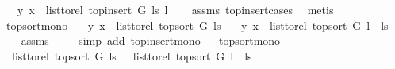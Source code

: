 \begin{isabellebody}
\ \ \ {\isachardoublequoteopen}{\isacharparenleft}{\kern0pt}y{\isacharcomma}{\kern0pt}\ x{\isacharparenright}{\kern0pt}\ {\isasymnotin}\ list{\isacharunderscore}{\kern0pt}to{\isacharunderscore}{\kern0pt}rel\ {\isacharparenleft}{\kern0pt}top{\isacharunderscore}{\kern0pt}insert\ G\ ls\ l{\isacharparenright}{\kern0pt}{\isachardoublequoteclose}\isanewline
%
\isadelimproof
\ \ %
\endisadelimproof
%
\isatagproof
{}\isamarkupfalse%
\ assms\ top{\isacharunderscore}{\kern0pt}insert{\isacharunderscore}{\kern0pt}cases\ \isamarkupfalse%
\ metis%
\endisatagproof
{\isafoldproof}%
%
\isadelimproof
\isanewline
%
\endisadelimproof
\isanewline
{}\isamarkupfalse%
\ top{\isacharunderscore}{\kern0pt}sort{\isacharunderscore}{\kern0pt}mono{\isacharcolon}{\kern0pt}\isanewline
\ \ \ {\isachardoublequoteopen}{\isacharparenleft}{\kern0pt}y{\isacharcomma}{\kern0pt}\ x{\isacharparenright}{\kern0pt}\ {\isasymin}\ list{\isacharunderscore}{\kern0pt}to{\isacharunderscore}{\kern0pt}rel\ {\isacharparenleft}{\kern0pt}top{\isacharunderscore}{\kern0pt}sort\ G\ ls{\isacharparenright}{\kern0pt}{\isachardoublequoteclose}\isanewline
\ \ \ {\isachardoublequoteopen}{\isacharparenleft}{\kern0pt}y{\isacharcomma}{\kern0pt}\ x{\isacharparenright}{\kern0pt}\ {\isasymin}\ list{\isacharunderscore}{\kern0pt}to{\isacharunderscore}{\kern0pt}rel\ {\isacharparenleft}{\kern0pt}top{\isacharunderscore}{\kern0pt}sort\ G\ {\isacharparenleft}{\kern0pt}l\ {\isacharhash}{\kern0pt}\ ls{\isacharparenright}{\kern0pt}{\isacharparenright}{\kern0pt}{\isachardoublequoteclose}\isanewline
%
\isadelimproof
\ \ %
\endisadelimproof
%
\isatagproof
{}\isamarkupfalse%
\ assms\ \isanewline
\ \ \isamarkupfalse%
\ {\isacharparenleft}{\kern0pt}simp\ add{\isacharcolon}{\kern0pt}\ top{\isacharunderscore}{\kern0pt}insert{\isacharunderscore}{\kern0pt}mono{\isacharparenright}{\kern0pt}%
\endisatagproof
{\isafoldproof}%
%
\isadelimproof
\ \isanewline
%
\endisadelimproof
\isanewline
\isanewline
\isanewline
{}\isamarkupfalse%
\ top{\isacharunderscore}{\kern0pt}sort{\isacharunderscore}{\kern0pt}mono{}{\isacharcolon}{\kern0pt}\isanewline
\ \ {\isachardoublequoteopen}list{\isacharunderscore}{\kern0pt}to{\isacharunderscore}{\kern0pt}rel\ {\isacharparenleft}{\kern0pt}top{\isacharunderscore}{\kern0pt}sort\ G\ ls{\isacharparenright}{\kern0pt}\ {\isasymsubseteq}\ \ list{\isacharunderscore}{\kern0pt}to{\isacharunderscore}{\kern0pt}rel\ {\isacharparenleft}{\kern0pt}top{\isacharunderscore}{\kern0pt}sort\ G\ {\isacharparenleft}{\kern0pt}l\ {\isacharhash}{\kern0pt}\ ls{\isacharparenright}{\kern0pt}{\isacharparenright}{\kern0pt}{\isachardoublequoteclose}\isanewline

\end{isabellebody}
